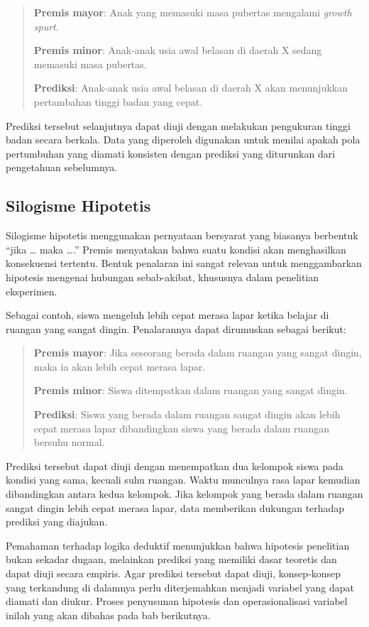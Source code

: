 \documentclass[
  indonesian,
  letterpaper,
  DIV=11,
  numbers=noendperiod]{scrreprt}
\begin{document}
\begin{quote}
\textbf{Premis mayor}: Anak yang memasuki masa pubertas mengalami
\emph{growth spurt}.

\textbf{Premis minor}: Anak-anak usia awal belasan di daerah X sedang
memasuki masa pubertas.

\textbf{Prediksi}: Anak-anak usia awal belasan di daerah X akan
menunjukkan pertambahan tinggi badan yang cepat.
\end{quote}

Prediksi tersebut selanjutnya dapat diuji dengan melakukan pengukuran
tinggi badan secara berkala. Data yang diperoleh digunakan untuk menilai
apakah pola pertumbuhan yang diamati konsisten dengan prediksi yang
diturunkan dari pengetahuan sebelumnya.

\subsection{Silogisme Hipotetis}\label{silogisme-hipotetis}

Silogisme hipotetis menggunakan pernyataan bersyarat yang biasanya
berbentuk ``jika \ldots{} maka \ldots.'' Premis menyatakan bahwa suatu
kondisi akan menghasilkan konsekuensi tertentu. Bentuk penalaran ini
sangat relevan untuk menggambarkan hipotesis mengenai hubungan
sebab-akibat, khususnya dalam penelitian eksperimen.

Sebagai contoh, siswa mengeluh lebih cepat merasa lapar ketika belajar
di ruangan yang sangat dingin. Penalarannya dapat dirumuskan sebagai
berikut:

\begin{quote}
\textbf{Premis mayor}: Jika seseorang berada dalam ruangan yang sangat
dingin, maka ia akan lebih cepat merasa lapar.

\textbf{Premis minor}: Siswa ditempatkan dalam ruangan yang sangat
dingin.

\textbf{Prediksi}: Siswa yang berada dalam ruangan sangat dingin akan
lebih cepat merasa lapar dibandingkan siswa yang berada dalam ruangan
bersuhu normal.
\end{quote}

Prediksi tersebut dapat diuji dengan menempatkan dua kelompok siswa pada
kondisi yang sama, kecuali suhu ruangan. Waktu munculnya rasa lapar
kemudian dibandingkan antara kedua kelompok. Jika kelompok yang berada
dalam ruangan sangat dingin lebih cepat merasa lapar, data memberikan
dukungan terhadap prediksi yang diajukan.

Pemahaman terhadap logika deduktif menunjukkan bahwa hipotesis
penelitian bukan sekadar dugaan, melainkan prediksi yang memiliki dasar
teoretis dan dapat diuji secara empiris. Agar prediksi tersebut dapat
diuji, konsep-konsep yang terkandung di dalamnya perlu diterjemahkan
menjadi variabel yang dapat diamati dan diukur. Proses penyusunan
hipotesis dan operasionalisasi variabel inilah yang akan dibahas pada
bab berikutnya.
\end{document}
